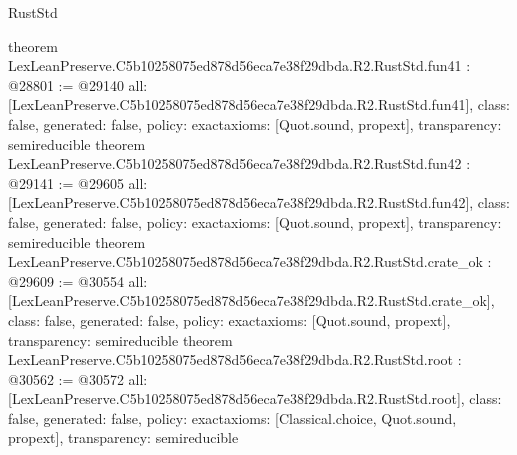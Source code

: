 \begin{lexlean}{RustStd}
\begin{coremodule}
{}
theorem LexLeanPreserve.C5b10258075ed878d56eca7e38f29dbda.R2.RustStd.fun41 : @28801 := @29140 {
  all: [LexLeanPreserve.C5b10258075ed878d56eca7e38f29dbda.R2.RustStd.fun41],
  class: false,
  generated: false,
  policy: exact{axioms: [Quot.sound, propext]},
  transparency: semireducible
}
theorem LexLeanPreserve.C5b10258075ed878d56eca7e38f29dbda.R2.RustStd.fun42 : @29141 := @29605 {
  all: [LexLeanPreserve.C5b10258075ed878d56eca7e38f29dbda.R2.RustStd.fun42],
  class: false,
  generated: false,
  policy: exact{axioms: [Quot.sound, propext]},
  transparency: semireducible
}
theorem LexLeanPreserve.C5b10258075ed878d56eca7e38f29dbda.R2.RustStd.crate_ok : @29609 := @30554 {
  all: [LexLeanPreserve.C5b10258075ed878d56eca7e38f29dbda.R2.RustStd.crate_ok],
  class: false,
  generated: false,
  policy: exact{axioms: [Quot.sound, propext]},
  transparency: semireducible
}
theorem LexLeanPreserve.C5b10258075ed878d56eca7e38f29dbda.R2.RustStd.root : @30562 := @30572 {
  all: [LexLeanPreserve.C5b10258075ed878d56eca7e38f29dbda.R2.RustStd.root],
  class: false,
  generated: false,
  policy: exact{axioms: [Classical.choice, Quot.sound, propext]},
  transparency: semireducible
}


\end{coremodule}
\end{lexlean}
